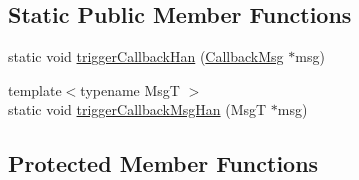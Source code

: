 \subsection*{Static Public Member Functions}
\begin{DoxyCompactItemize}
\item 
static void \hyperlink{structvt_1_1pipe_1_1_pipe_manager_base_acae150f3cb2f27a84f39186ad4dd1a37}{trigger\+Callback\+Han} (\hyperlink{structvt_1_1pipe_1_1_callback_msg}{Callback\+Msg} $\ast$msg)
\item 
{\footnotesize template$<$typename MsgT $>$ }\\static void \hyperlink{structvt_1_1pipe_1_1_pipe_manager_base_a56855a2a2c55decbb79971f51fb9dcce}{trigger\+Callback\+Msg\+Han} (MsgT $\ast$msg)
\end{DoxyCompactItemize}
\subsection*{Protected Member Functions}
